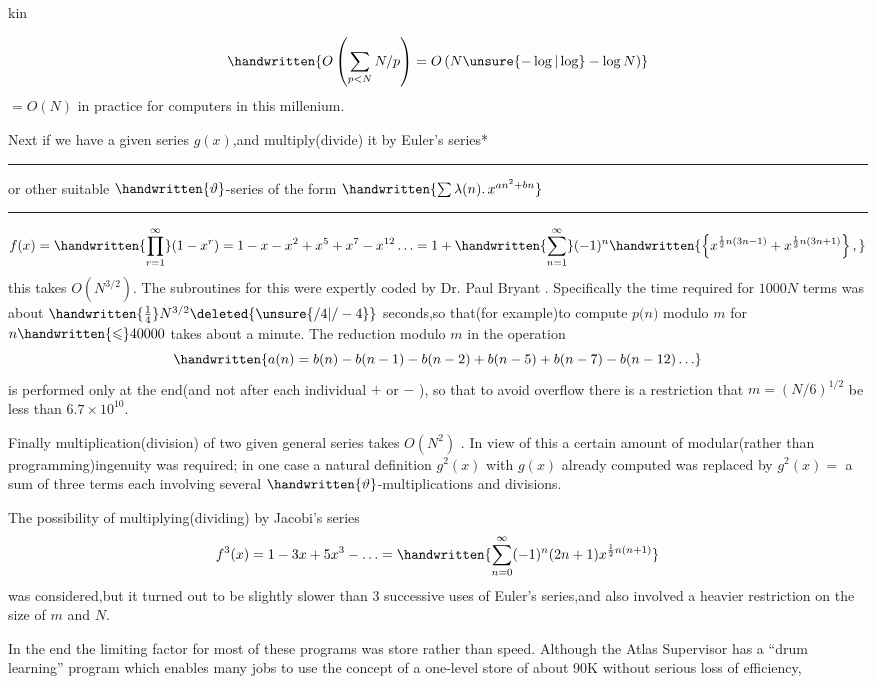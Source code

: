 \begin{flushright}
kin 
\end{flushright}

\[
\handwritten{O\left(\sum_{p<N}N/p\right)=O\left(N\unsure{-\log|\log}-\log N\right)}
\]
$=O(N)$ in practice for computers in this millenium.

Next if we have a given series $g(x)$,and multiply(divide) it by Euler's series*

\noindent\rule{\linewidth}{0.3pt}\par
\noindent *or other suitable $\handwritten{\vartheta}$-series of the form $\handwritten{\sum\lambda(n)\ldotp x^{an^{2}+bn}}$
\par\noindent\rule{\linewidth}{0.3pt}
{\small
\[
f(x)=\handwritten{\prod_{r=1}^{\infty}}(1-x^{r})=1-x-x^{2}+x^{5}+x^{7}-x^{12}\ldots=1+\handwritten{\sum_{n=1}^{\infty}}(-1)^{n}\handwritten{\left\{x^{\frac12 n(3n-1)}+x^{\frac12 n(3n+1)}\right\},}
\]
}
this takes $O(N^{3/2})$. The subroutines for this were expertly coded by Dr. Paul Bryant . Specifically the time required for $1000N$ terms was about $\handwritten{\frac14}N^{3/2}\deleted{\unsure{/4|/-4}}$\reversemarginpar{} seconds,so that(for example)to compute \uline{$p(n$}$)$ modulo \uline{$m$} for $n\handwritten{\leqslant}40000$ takes about a minute. The reduction modulo $m$ in the operation
\[
\handwritten{a(n)=b(n)-b(n-1)-b(n-2)+b(n-5)+b(n-7)-b(n-12)\ldots}
\]
is performed only at the end(and not after each individual $+$ or $-$ ), so that to avoid overflow there is a restriction that $m=(N/6)^{1/2}$ be less than $6.7\times10^{10}$.

Finally multiplication(division) of two given general series takes $O(N^{2})$ . In view of this a certain amount of modular(rather than programming)ingenuity was required; in one case a natural definition $g^{2}(x)$ with $g(x)$ already computed was replaced by $g^{2}(x)=$ a sum of three terms each involving several $\handwritten{\vartheta}$-multiplications and divisions.

The possibility of multiplying(dividing) by Jacobi's series
\[
f^{3}(x)=1-3x+5x^{3}-\ldots=\handwritten{\sum_{n=0}^{\infty}(-1)^{n}(2n+1)x^{\frac12 n(n+1)}}
\]
was considered,but it turned out to be slightly slower than 3 successive uses of Euler's series,and also involved a heavier restriction on the size of $m$ and $N$.

In the end the limiting factor for most of these programs was store rather than speed. Although the Atlas Supervisor has a ``drum learning'' program which enables many jobs to use the concept of a one-level store of about 90K without serious loss of efficiency,
\normalmarginpar
